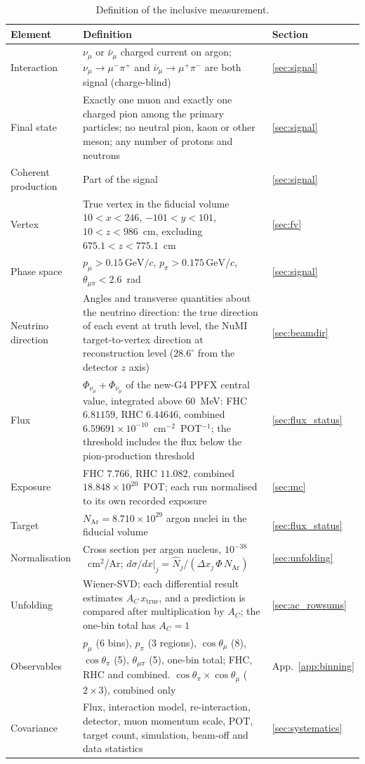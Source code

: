 \documentclass[11pt,a4paper]{article}
\newcommand{\GeVc}{\,\text{GeV}\!/c}
\begin{document}
\begin{table}[H]
  \centering
  \caption{Definition of the inclusive measurement.}
  \label{tab:measdef}
  \footnotesize
  \begin{tabular}{@{}p{3.1cm}p{9.9cm}p{1.5cm}@{}}
    \toprule
    Element & Definition & Section \\
    \midrule
    Interaction & $\nu_\mu$ or $\bar\nu_\mu$ charged current on argon; $\nu_\mu\to\mu^-\pi^+$ and
      $\bar\nu_\mu\to\mu^+\pi^-$ are both signal (charge-blind) & \ref{sec:signal} \\
    Final state & Exactly one muon and exactly one charged pion among the primary particles; no neutral
      pion, kaon or other meson; any number of protons and neutrons & \ref{sec:signal} \\
    Coherent production & Part of the signal & \ref{sec:signal} \\
    Vertex & True vertex in the fiducial volume $10<x<246$, $-101<y<101$, $10<z<986$~cm, excluding
      $675.1<z<775.1$~cm & \ref{sec:fv} \\
    Phase space & $p_\mu>0.15\GeVc$, $p_\pi>0.175\GeVc$, $\theta_{\mu\pi}<2.6$~rad & \ref{sec:signal} \\
    Neutrino direction & Angles and transverse quantities about the neutrino direction: the true direction
      of each event at truth level, the NuMI target-to-vertex direction at reconstruction level
      ($28.6^\circ$ from the detector $z$ axis) & \ref{sec:beamdir} \\
    Flux & $\Phi_{\nu_\mu}+\Phi_{\bar\nu_\mu}$ of the new-G4 PPFX central value, integrated above
      $60$~MeV: FHC $6.81159$, RHC $6.44646$, combined $6.59691\times10^{-10}$~cm$^{-2}$~POT$^{-1}$; the
      threshold includes the flux below the pion-production threshold & \ref{sec:flux_status} \\
    Exposure & FHC $7.766$, RHC $11.082$, combined $18.848\times10^{20}$~POT; each run normalised to its
      own recorded exposure & \ref{sec:mc} \\
    Target & $N_\mathrm{Ar}=8.710\times10^{29}$ argon nuclei in the fiducial volume & \ref{sec:flux_status} \\
    Normalisation & Cross section per argon nucleus, $10^{-38}$~cm$^2$/Ar;
      $d\sigma/dx|_j=\hat N_j/(\Delta x_j\,\Phi\,N_\mathrm{Ar})$ & \ref{sec:unfolding} \\
    Unfolding & Wiener-SVD; each differential result estimates $A_C\,x_\mathrm{true}$, and a prediction is
      compared after multiplication by $A_C$; the one-bin total has $A_C=1$ & \ref{sec:ac_rowsums} \\
    Observables & $p_\mu$ (6 bins), $p_\pi$ (3 regions), $\cos\theta_\mu$ (8), $\cos\theta_\pi$ (5),
      $\theta_{\mu\pi}$ (5), one-bin total; FHC, RHC and combined. $\cos\theta_\pi\times\cos\theta_\mu$
      ($2\times3$), combined only & App.~\ref{app:binning} \\
    Covariance & Flux, interaction model, re-interaction, detector, muon momentum scale, POT, target
      count, simulation, beam-off and data statistics & \ref{sec:systematics} \\
    \bottomrule
  \end{tabular}
\end{table}
\end{document}
